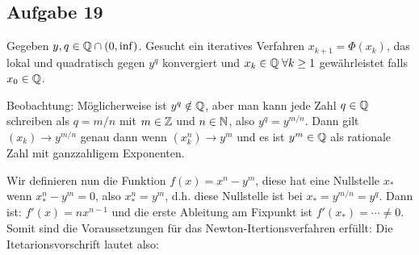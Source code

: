 \subsection*{Aufgabe 19}

Gegeben $y, q \in \mathbb Q \cap (0, \inf)$. Gesucht ein iteratives Verfahren $x_{k + 1} = \Phi (x_k)$,
das lokal und quadratisch gegen $y^q$ konvergiert und $x_k \in \mathbb Q \; \forall k \ge 1$
gewährleistet falls $x_0 \in \mathbb Q$.

Beobachtung: Möglicherweise ist $y^q \notin \mathbb Q$, aber man kann jede Zahl
$q \in \mathbb Q$ schreiben als $q = m /n$ mit $m \in \mathbb Z$ und $n \in \mathbb N$,
also $y^q = y^{m/n}$. Dann gilt $(x_k) \rightarrow y^{m/n}$ genau dann wenn
$\left(x_k^n\right)\rightarrow y^m$ und es ist $y^m \in \mathbb Q$ als rationale Zahl
mit ganzzahligem Exponenten.

Wir definieren nun die Funktion $f(x) = x^n - y^m$, diese hat eine Nullstelle $x_*$
wenn $x_*^n - y^m = 0$, also  $x_*^n = y^m$, d.h. diese Nullstelle ist
bei $x_* = y^{m/n}= y^q$. Dann ist: $f'(x) = n x^{n - 1}$ und die erste Ableitung
am Fixpunkt ist $f'(x_*) =  \cdots \ne 0$. Somit sind die Voraussetzungen für das
Newton-Itertionsverfahren erfüllt: Die Itetarionsvorschrift lautet also:
